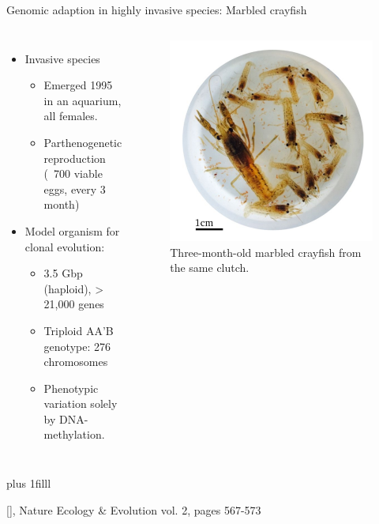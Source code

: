 \documentclass[10pt]{beamer}
\newcommand{\credit}[1]{{\vskip0pt plus 1filll \par \raggedleft \scriptsize \mdseries \color{mDarkBrown} #1 \par}}
\newcommand{\citeme}[1]{{\xspace\color{scAqua} \scriptsize [\cite{#1}]}}
\begin{document}
\begin{frame}{Genomic adaption in highly invasive species: Marbled crayfish}
\begin{columns}
	\begin{itemize}
		\item Invasive species 
		\begin{itemize}
			\item Emerged 1995 in an aquarium, all females.
			\item Parthenogenetic reproduction \linebreak (~700 viable eggs, every 3 month)
		\end{itemize}
		\item Model organism for clonal evolution:
		\begin{itemize}
			\item 3.5 Gbp (haploid), >​21,000 genes
			\item Triploid AA’B genotype: 276 chromosomes
			\item Phenotypic variation solely by DNA-methylation.
		\end{itemize}
	\end{itemize}
	\begin{figure}
		\includegraphics[width=\textwidth]{figures/marmorkrebs.png}
		\caption{Three-month-old marbled crayfish from the same clutch.}
	\end{figure}
\end{columns}
\credit{\citeme{Gutekunst2018}, Nature Ecology \& Evolution vol. 2, pages 567-573}
\end{frame}
\end{document}
